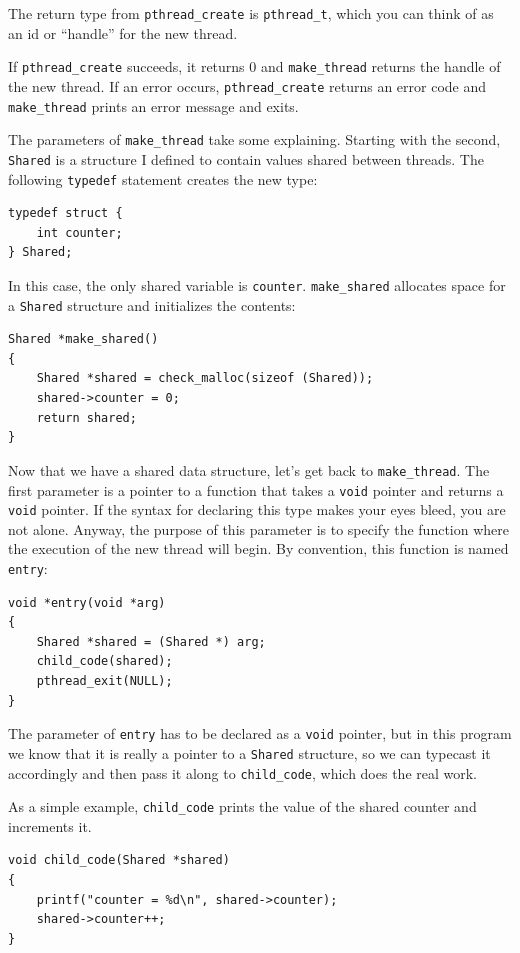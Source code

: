 \documentclass[12pt]{book}
\begin{document}
{The return type from \verb"pthread_create" is \verb"pthread_t",
which you can think of as an id or ``handle'' for the new thread.  

If {\tt pthread\_create} succeeds, it returns 0 and \verb"make_thread"
returns the handle of the new thread.
If an error occurs, {\tt pthread\_create} 
returns an error code and \verb"make_thread" prints an error message
and exits.

The parameters of \verb"make_thread" take some
explaining.  Starting with the second, {\tt Shared}
is a structure I defined to contain values shared between threads.
The following {\tt typedef} statement creates the new type:

\begin{verbatim}
typedef struct {
    int counter;
} Shared;
\end{verbatim}

In this case, the only shared variable is {\tt counter}.
{\tt make\_shared} allocates
space for a {\tt Shared} structure and initializes the contents:

\begin{verbatim}
Shared *make_shared()
{
    Shared *shared = check_malloc(sizeof (Shared));
    shared->counter = 0;
    return shared;
}
\end{verbatim}

Now that we have a shared data structure, let's get back to
\verb"make_thread".
The first parameter is a pointer to a function that takes
a {\tt void} pointer and returns a {\tt void} pointer.  If the syntax
for declaring this type makes your eyes bleed, you are not alone.
Anyway, the purpose of this parameter is to specify the function where
the execution of the new thread will begin.  By convention, this
function is named {\tt entry}:

\begin{verbatim}
void *entry(void *arg)
{
    Shared *shared = (Shared *) arg;
    child_code(shared);
    pthread_exit(NULL);
}
\end{verbatim}

The parameter of {\tt entry} has to be declared as a {\tt void}
pointer, but in this program we know that it is really a pointer to a
{\tt Shared} structure, so we can typecast it accordingly and then
pass it along to {\tt child\_code}, which does the real work.

As a simple example, \verb"child_code" prints the value of
the shared counter and increments it.

\begin{verbatim}
void child_code(Shared *shared)
{  
    printf("counter = %d\n", shared->counter);
    shared->counter++;
}
\end{verbatim}

}
\end{document}
